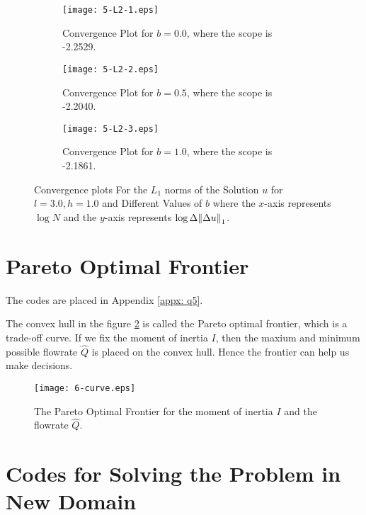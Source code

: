 \documentclass{assignment}[2019/10/15]
\begin{document}
    \begin{figure}[htb]
        \begin{subfigure}[b]{0.32\textwidth}
            \centering
            \texttt{[image: 5-L2-1.eps]}
            \caption{Convergence Plot for $b = 0.0$, where the scope is -2.2529.}
        \end{subfigure}
        \hfill
        \begin{subfigure}[b]{0.32\textwidth}
            \centering
            \texttt{[image: 5-L2-2.eps]}
            \caption{Convergence Plot for $b = 0.5$, where the scope is -2.2040.}
        \end{subfigure}
        \hfill
        \begin{subfigure}[b]{0.32\textwidth}
            \centering
            \texttt{[image: 5-L2-3.eps]}
            \caption{Convergence Plot for $b = 1.0$, where the scope is -2.1861.}
        \end{subfigure}
        \caption{Convergence plots For the $L_1$ norms of the Solution $u$ for $l = 3.0, h = 1.0$ and Different Values of $b$ where the $x$-axis represents $\log N$ and the $y$-axis represents $\log \Delta \norm{\Delta u}_1$.}
        \label{fig: q5-L2}
    \end{figure}

    \section{Pareto Optimal Frontier}

    The codes are placed in Appendix \ref{appx: q5}.

    The convex hull in the figure \ref{fig: q6} is called the Pareto optimal frontier, which is a trade-off curve. If we fix the moment of inertia $I$, then the maxium and minimum possible flowrate $\hat Q$ is placed on the convex hull. Hence the frontier can help us make decisions.

    \begin{figure}[htb]
        \centering
        \texttt{[image: 6-curve.eps]}
        \caption{The Pareto Optimal Frontier for the moment of inertia $I$ and the flowrate $\hat Q$.}
        \label{fig: q6}
    \end{figure}

    \clearpage\appendix

    \section{Codes for Solving the Problem in New Domain}\label{appx: q3}
\end{document}
